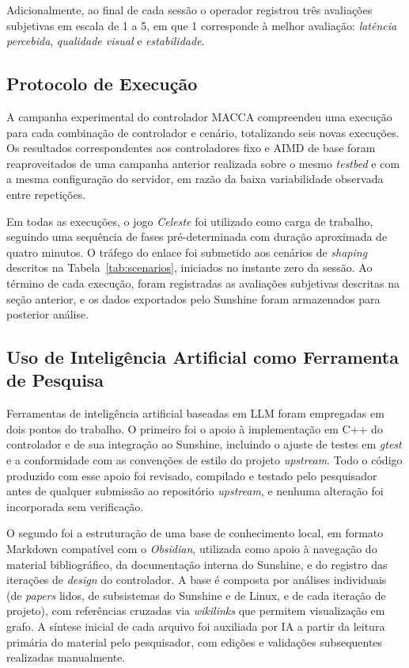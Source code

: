\documentclass[conference]{IEEEtran}
\begin{document}
Adicionalmente, ao final de cada sessão o operador registrou
três avaliações subjetivas em escala de 1 a 5, em que 1
corresponde à melhor avaliação: \emph{latência percebida},
\emph{qualidade visual} e \emph{estabilidade}.

\subsection{Protocolo de Execução}

A campanha experimental do controlador MACCA compreendeu uma execução para cada combinação de controlador e cenário, totalizando seis novas execuções. Os resultados correspondentes aos controladores fixo e AIMD de base foram reaproveitados de uma campanha anterior realizada sobre o mesmo \emph{testbed} e com a mesma configuração do servidor, em razão da baixa variabilidade observada entre repetições.

Em todas as execuções, o jogo \emph{Celeste} foi utilizado como carga de trabalho, seguindo uma sequência de fases pré-determinada com duração aproximada de quatro minutos. O tráfego do enlace foi submetido aos cenários de \emph{shaping} descritos na Tabela~\ref{tab:scenarios}, iniciados no instante zero da sessão. Ao término de cada execução, foram registradas as avaliações subjetivas descritas na seção anterior, e os dados exportados pelo Sunshine foram armazenados para posterior análise.

\subsection{Uso de Inteligência Artificial como Ferramenta de Pesquisa}

Ferramentas de inteligência artificial baseadas em LLM foram empregadas em dois pontos do
trabalho. O primeiro foi o apoio à implementação em C++ do
controlador e de sua integração ao Sunshine, incluindo o
ajuste de testes em \emph{gtest} e a conformidade com as
convenções de estilo do projeto \emph{upstream}. Todo o código
produzido com esse apoio foi revisado, compilado e testado pelo
pesquisador antes de qualquer submissão ao repositório
\emph{upstream}, e nenhuma alteração foi incorporada sem
verificação.

O segundo foi a estruturação de uma base de conhecimento
local, em formato Markdown compatível com o \emph{Obsidian},
utilizada como apoio à navegação do material bibliográfico, da
documentação interna do Sunshine, e do registro das iterações
de \emph{design} do controlador. A base é composta por
análises individuais (de \emph{papers} lidos, de subsistemas
do Sunshine e de Linux, e de cada iteração de projeto), com
referências cruzadas via \emph{wikilinks} que permitem
visualização em grafo. A síntese inicial de cada arquivo foi
auxiliada por IA a partir da leitura primária do material pelo
pesquisador, com edições e validações subsequentes realizadas
manualmente.
\end{document}
